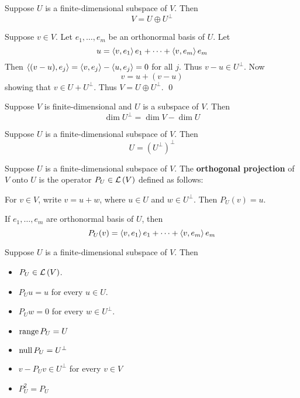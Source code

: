 \begin{theorem} 
    Suppose $U$ is a finite-dimensional subspace of $V$. Then
    \[ V = U \oplus U^\perp \]

    \begin{proof*}
        Suppose $v \in V$. Let $e_1, \dots, e_m$ be an orthonormal basis of $U$. Let
        \[ u = \left\langle v, e_1 \right\rangle e_1 + \dots + \left\langle v,e_m \right\rangle e_m \]
        Then $\left\langle (v - u), e_j \right\rangle = \left\langle v,e_j \right\rangle - \left\langle u,e_j \right\rangle = 0$ for all $j$. Thus $v - u \in U^\perp$.
        Now
        \[ v = u + (v - u) \]
        showing that $v \in U + U^\perp$. Thus $V = U \oplus U^\perp$. \qed
    \end{proof*}
\end{theorem}

\begin{theorem} 
    Suppose $V$ is finite-dimensional and $U$ is a subspace of $V$. Then
    \[ \dim U^\perp = \dim V - \dim U \]
\end{theorem}

\begin{theorem}
    Suppose $U$ is a finite-dimensional subspace of $V$. Then
    \[ U = (U^\perp)^\perp \]
\end{theorem}

\begin{definition}
    Suppose $U$ is a finite-dimensional subspace of $V$. The \textbf{orthogonal projection} of $V$ onto $U$
    is the operator $P_U \in \mathcal{L} \left( V \right)$ defined as follows:

    For $v \in V$, write $v = u + w$, where $u \in U$ and $w \in U^\perp$. Then $P_U(v) = u$.

    If $e_1, \dots, e_m$ are orthonormal basis of $U$, then
    \[ P_U(v) = \left\langle v,e_1 \right\rangle e_1 + \dots + \left\langle v,e_m \right\rangle e_m \]
\end{definition}

\begin{theorem}
    Suppose $U$ is a finite-dimensional subspace of $V$. Then
    \begin{itemize}
        \item $P_U \in \mathcal{L} \left( V \right)$.
        \item $P_U u = u$ for every $u \in U$.
        \item $P_U w = 0$ for every $w \in U^\perp$.
        \item $\operatorname{range} P_U = U$
        \item $\operatorname{null} P_U = U^\perp$
        \item $v - P_Uv \in U^\perp$ for every $v \in V$
        \item $P_U^2 = P_U$
    \end{itemize}
\end{theorem}

